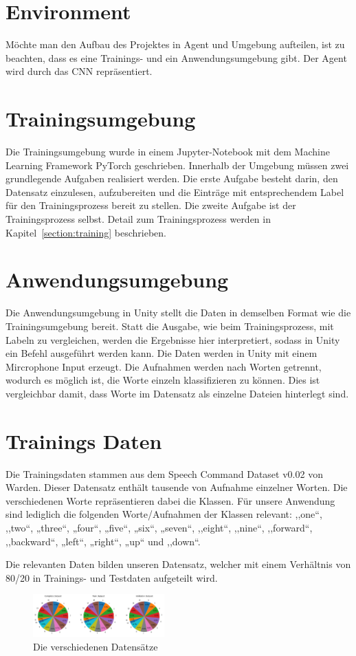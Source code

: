 \documentclass[sigconf]{acmart}
\begin{document}
\section{Environment}
Möchte man den Aufbau des Projektes in Agent und Umgebung aufteilen, ist zu beachten, dass es eine Trainings- und ein Anwendungsumgebung gibt. Der Agent wird durch das CNN repräsentiert. 

\section{Trainingsumgebung}
\label{section:Umgebung}
Die Trainingsumgebung wurde in einem Jupyter-Notebook mit dem Machine Learning Framework PyTorch geschrieben. Innerhalb der Umgebung müssen zwei grundlegende Aufgaben realisiert werden. 
Die erste Aufgabe besteht darin, den Datensatz einzulesen, aufzubereiten und die Einträge mit entsprechendem Label für den Trainingsprozess bereit zu stellen. Die zweite Aufgabe ist der Trainingsprozess selbst. Detail zum Trainingsprozess werden in Kapitel~\ref{section:training} beschrieben. 

\section{Anwendungsumgebung}
Die Anwendungsumgebung in Unity stellt die Daten in demselben Format wie die Trainingsumgebung bereit. Statt die Ausgabe, wie beim Trainingsprozess,  mit Labeln zu vergleichen, werden die Ergebnisse hier interpretiert, sodass in Unity ein Befehl ausgeführt werden kann. Die Daten werden in Unity mit einem Mircrophone Input erzeugt. Die Aufnahmen werden nach Worten getrennt, wodurch es möglich ist, die Worte einzeln klassifizieren zu können. Dies ist vergleichbar damit, dass Worte im Datensatz als einzelne Dateien hinterlegt sind. 

\section{Trainings Daten}
Die Trainingsdaten stammen aus dem Speech Command Dataset v0.02 von Warden. Dieser Datensatz enthält tausende von Aufnahme einzelner Worten. Die verschiedenen Worte repräsentieren dabei die Klassen. Für unsere Anwendung sind lediglich die folgenden Worte/Aufnahmen der Klassen relevant: ,,one“, ,,two“, „three“, „four“, „five“, „six“, „seven“, ,,eight“, ,,nine“, ,,forward“, ,,backward“, „left“, „right“, „up“ und ,,down“.  

Die relevanten Daten bilden unseren Datensatz, welcher mit einem Verhältnis von 80/20 in Trainings- und Testdaten aufgeteilt wird. 
\begin{figure}[H]
  \includegraphics[width=0.45\textwidth]{images/DataBalance}
  \caption{Die verschiedenen Datensätze}
  \Description{}
  \label{fig:TrainingsDaten}
\end{figure}
\end{document}
